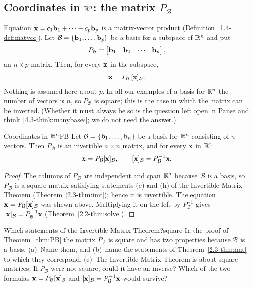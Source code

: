 \documentclass[11pt]{article}
\begin{document}
\subsection*{Coordinates in $\mathbb{R}^n$: the matrix $P_{\mathcal{B}}$}

Equation $\mathbf{x}=c_1\mathbf{b}_1+\cdots+c_p\mathbf{b}_p$ is a matrix-vector product (Definition~\ref{1.4-def:matvec}). Let $\mathcal{B}=\{\mathbf{b}_1,\dots,\mathbf{b}_p\}$ be a basis for a subspace of $\mathbb{R}^n$ and put
\[
P_{\mathcal{B}}=\begin{bmatrix}\mathbf{b}_1&\mathbf{b}_2&\cdots&\mathbf{b}_p\end{bmatrix},
\]
an $n\times p$ matrix. Then, for every $\mathbf{x}$ in the subspace,
\[
\mathbf{x}=P_{\mathcal{B}}\,[\mathbf{x}]_{\mathcal{B}}.
\]
Nothing is assumed here about $p$. In all our examples of a basis for $\mathbb{R}^n$ the number of vectors is $n$, so $P_{\mathcal{B}}$ is square; this is the case in which the matrix can be inverted. (Whether it must always be so is the question left open in Pause and think~\ref{4.3-think:manybases}; we do not need the answer.)

\begin{thm}{Coordinates in $\mathbb{R}^n$}{PB}
Let $\mathcal{B}=\{\mathbf{b}_1,\dots,\mathbf{b}_n\}$ be a basis for $\mathbb{R}^n$ consisting of $n$ vectors. Then $P_{\mathcal{B}}$ is an invertible $n\times n$ matrix, and for every $\mathbf{x}$ in $\mathbb{R}^n$
\[
\mathbf{x}=P_{\mathcal{B}}[\mathbf{x}]_{\mathcal{B}},\qquad [\mathbf{x}]_{\mathcal{B}}=P_{\mathcal{B}}^{-1}\mathbf{x}.
\]
\end{thm}

\begin{proof}
The columns of $P_{\mathcal{B}}$ are independent and span $\mathbb{R}^n$ because $\mathcal{B}$ is a basis, so $P_{\mathcal{B}}$ is a square matrix satisfying statements (e) and (h) of the Invertible Matrix Theorem (Theorem~\ref{2.3-thm:imt}); hence it is invertible. The equation $\mathbf{x}=P_{\mathcal{B}}[\mathbf{x}]_{\mathcal{B}}$ was shown above. Multiplying it on the left by $P_{\mathcal{B}}^{-1}$ gives $[\mathbf{x}]_{\mathcal{B}}=P_{\mathcal{B}}^{-1}\mathbf{x}$ (Theorem~\ref{2.2-thm:solve}).
\end{proof}

\begin{think}{Which statements of the Invertible Matrix Theorem?}{square}
In the proof of Theorem~\ref{thm:PB} the matrix $P_{\mathcal{B}}$ is square and has two properties because $\mathcal{B}$ is a basis. (a)~Name them, and (b)~name the statements of Theorem~\ref{2.3-thm:imt} to which they correspond. (c)~The Invertible Matrix Theorem is about square matrices. If $P_{\mathcal{B}}$ were not square, could it have an inverse? Which of the two formulas $\mathbf{x}=P_{\mathcal{B}}[\mathbf{x}]_{\mathcal{B}}$ and $[\mathbf{x}]_{\mathcal{B}}=P_{\mathcal{B}}^{-1}\mathbf{x}$ would survive?
\end{think}
\end{document}

